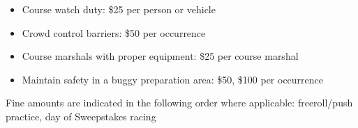 \begin{appendices}
\begin{itemize}
			\item Course watch duty: \$25 per person or vehicle

			\item Crowd control barriers: \$50 per occurrence

			\item Course marshals with proper equipment: \$25 per course marshal
			
			\item Maintain safety in a buggy preparation area: \$50, \$100 per occurrence

		\end{itemize}

		\noindent Fine amounts are indicated in the following order where applicable: \newline
		freeroll/push practice, day of Sweepstakes racing
\end{appendices}
